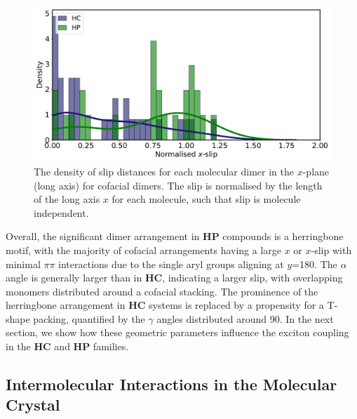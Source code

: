\begin{figure}[t]
\centering
  \includegraphics[width=0.8\linewidth]{5ConnectingCrystalStructure/xslip_density}
  \caption[$x$-slip densities for dimer configurations of \textbf{HC} and \textbf{HP} systems]{The density of slip distances for each molecular dimer in the $x$-plane (long axis) for cofacial dimers. The slip is normalised by the length of the long axis $x$ for each molecule, such that slip is molecule independent.}
  \label{figure: xslip_density}
\end{figure}


 Overall, the significant dimer arrangement in \textbf{HP} compounds is a herringbone motif, with the majority of cofacial arrangements having a large $x$ or $x$-slip with minimal $\pi\pi$ interactions due to the single aryl groups aligning at $y$=180\degree. The $\alpha$ angle is generally larger than in \textbf{HC}, indicating a larger slip, with overlapping monomers distributed around a cofacial stacking. The prominence of the herringbone arrangement in \textbf{HC} systems is replaced by a propensity for a T-shape packing, quantified by the $\gamma$ angles distributed around 90\degree. In the next section, we show how these geometric parameters influence the exciton coupling in the \textbf{HC} and \textbf{HP} families.


\subsection{Intermolecular Interactions in the Molecular Crystal}\label{section: Connecting_Interactions}

